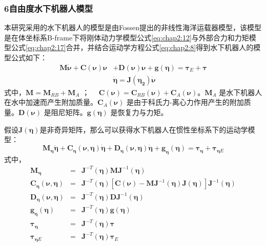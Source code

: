 \subsubsection{6自由度水下机器人模型 }

本研究采用的水下机器人的模型是由Fossen提出的非线性海洋运载器模型，该模型是在体坐标系B-frame下将刚体动力学模型公式\ref{eq:chap2:12}与外部合力和力矩模型公式\ref{eq:chap2:17}合并，并结合运动学方程公式\ref{eq:chap2:8}得到水下机器人的模型公式如下\cite{fossen1994guidance}：
\begin{equation}
\label{eq:chap2:30}
\begin{aligned}
\bm{M} \dot {\bm{\nu}} + \bm{C}(\bm{\nu}) \bm{\nu}&
+ \bm{D}(\bm{\nu}) \bm{\nu} + \bm{g}(\bm{\eta}) = \bm{\tau}_E +  \bm{\tau}\\
&\dot{\bm{\eta}}= \bm{J(\bm{\eta}_2)}   \dot{\bm{\nu}}
\end{aligned}
\end{equation}
式中，$\bm{M} = \bm{M}_{RB} +\bm{M}_A$ ； $\quad \bm{C}(\bm{\nu}) =  \bm{C}_{RB}(\bm{\nu}) +  \bm{C}_{A}(\bm{\nu})$。$\bm{M}_A $ 是水下机器人在水中加速而产生附加质量。$\bm{C}_{A}(\bm{\nu})$ 是由于科氏力-离心力作用产生的附加质量。$\bm{D}(\bm{\nu})$ 是阻尼矩阵。$\bm{g}(\bm{\eta})$ 是恢复力与力矩。

假设$\bm{J}(\bm{\eta})$是非奇异矩阵，那么可以获得水下机器人在惯性坐标系下的运动学模型：
\begin{equation}
\label{eq:chap2:31}
\bm{M}_{\bm{\eta}}{\ddot {\bm{\eta}}} +\bm{C}_{\bm{\eta}}(\bm{\nu},\bm{\eta}) {\dot {\bm{\eta}}} + \bm{D}_{\bm{\eta}} (\bm{\nu},\bm{\eta}) {\dot {\bm{\eta}} }+\bm{g}_{\bm{\eta}}(\bm{\eta}) = \bm{\tau}_{\bm{\eta}}+\bm{\tau}_{\bm{\eta}E}
\end{equation}
式中，
\begin{eqnarray}
\label{eq:chap2:32}
\bm{M}_{\bm{\eta}} &=& \bm{J}^{-T}(\bm{\eta})\bm{M}\bm{J}^{-1}(\bm{\eta})\\
\bm{C}_{\bm{\eta}}(\bm{\nu},\bm{\eta}) &=& \bm{J}^{-T}(\bm{\eta})[\bm{C}(\bm{\nu})-\bm{M}\bm{J}^{-1}(\bm{\eta})\bm{J}(\bm{\eta})] \bm{J}^{-1}(\bm{\eta})\\
\bm{D}_{\bm{\eta}} (\bm{\nu},\bm{\eta})&=& \bm{J}^{-T}(\bm{\eta})\bm{D}\bm{J}^{-1}(\bm{\eta})  \\
\bm{g}_{\bm{\eta}}(\bm{\eta}) &=& \bm{J}^{-T}(\bm{\eta}) \bm{g}(\bm{\eta})  \\
\bm{\tau}_{\bm{\eta}} &=& \bm{J}^{-T}(\bm{\eta}) \bm{\tau}\\
\bm{\tau}_{\bm{\eta}E} &=& \bm{J}^{-T}(\bm{\eta})\bm{\tau}_{E}
\end{eqnarray}


